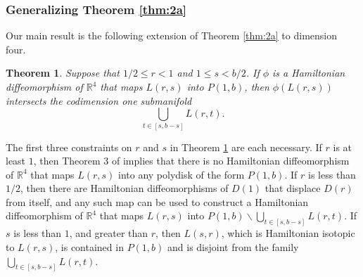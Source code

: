 \documentclass[12pt]{amsart}
\newtheorem{theorem}{Theorem}[section]
\theoremstyle{definition}
\newcommand{\RR}{{\mathbb R}}
\begin{document}
\subsubsection{Generalizing Theorem \ref{thm:2a}}\label{secgen}
Our main result is the following extension of Theorem \ref{thm:2a} to dimension four.

\begin{theorem}\label{lagint}
Suppose that  $1/2\leq r<1$ and $1 \leq s <b/2$. If $\phi$ is a Hamiltonian diffeomorphism of $\RR^4$ that maps $L(r,s)$ into $P(1,b)$, then $\phi(L(r,s))$ intersects the codimension one submanifold
\begin{equation} 
\bigcup_{t \in [s,b-s]} L(r, t).
\end{equation}
\end{theorem}


The first three constraints on $r$ and $s$ in Theorem \ref{lagint} are each necessary. If $r$ is at least $1$, then Theorem 3 of \cite{ho} implies that there is no Hamiltonian diffeomorphism of $\RR^4$ that maps $L(r,s)$ into any polydisk of the form $P(1,b)$. If $r$ is less than $1/2$, then there are Hamiltonian diffeomorphisms of $D(1)$ that displace $D(r)$ from itself, and any such map can be used to construct a Hamiltonian diffeomorphism of $\RR^4$ that maps $L(r,s)$ into $P(1,b) \smallsetminus \bigcup_{t \in [s,b-s]} L(r, t).$ If $s$ is less than $1$, and greater than $r$, then $L(s,r)$, which is Hamiltonian isotopic to $L(r,s)$, is contained in $P(1,b)$ and is disjoint from the family $\bigcup_{t \in [s,b-s]} L(r, t)$. 




\medskip


\end{document}
